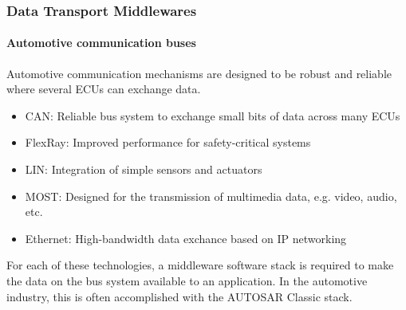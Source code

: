 \begin{frame}
\frametitle{Data Transport Middlewares}
\framesubtitle{Automotive communication buses}
Automotive communication mechanisms are designed to be robust and reliable
where several ECUs can exchange data.
\begin{itemize}
    \item CAN: Reliable bus system to exchange small bits of data across many ECUs
    \item FlexRay: Improved performance for safety-critical systems
    \item LIN: Integration of simple sensors and actuators
    \item MOST: Designed for the transmission of multimedia data,
        e.g. video, audio, etc.
    \item Ethernet: High-bandwidth data exchance based on IP networking
\end{itemize}
For each of these technologies, a middleware software stack is required to make
the data on the bus system available to an application. In the automotive
industry, this is often accomplished with the AUTOSAR Classic stack.
\end{frame}

